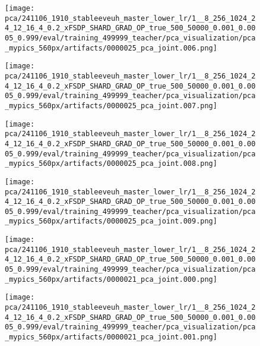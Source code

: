 \begin{figure*}[p]
\begin{subfigure}[t]{0.097\textwidth}
    \end{subfigure}\hfill
    \begin{subfigure}[t]{0.097\textwidth}
        \centering
        \texttt{[image: pca/241106\_1910\_stableeveuh\_master\_lower\_lr/1\_\_8\_256\_1024\_24\_12\_16\_4\_0.2\_xFSDP\_SHARD\_GRAD\_OP\_true\_500\_50000\_0.001\_0.0005\_0.999/eval/training\_499999\_teacher/pca\_visualization/pca\_mypics\_560px/artifacts/0000025\_pca\_joint.006.png]}
    \end{subfigure}\hfill
    \begin{subfigure}[t]{0.097\textwidth}
        \centering
        \texttt{[image: pca/241106\_1910\_stableeveuh\_master\_lower\_lr/1\_\_8\_256\_1024\_24\_12\_16\_4\_0.2\_xFSDP\_SHARD\_GRAD\_OP\_true\_500\_50000\_0.001\_0.0005\_0.999/eval/training\_499999\_teacher/pca\_visualization/pca\_mypics\_560px/artifacts/0000025\_pca\_joint.007.png]}
    \end{subfigure}\hfill
    \begin{subfigure}[t]{0.097\textwidth}
        \centering
        \texttt{[image: pca/241106\_1910\_stableeveuh\_master\_lower\_lr/1\_\_8\_256\_1024\_24\_12\_16\_4\_0.2\_xFSDP\_SHARD\_GRAD\_OP\_true\_500\_50000\_0.001\_0.0005\_0.999/eval/training\_499999\_teacher/pca\_visualization/pca\_mypics\_560px/artifacts/0000025\_pca\_joint.008.png]}
    \end{subfigure}\hfill
    \begin{subfigure}[t]{0.097\textwidth}
        \centering
        \texttt{[image: pca/241106\_1910\_stableeveuh\_master\_lower\_lr/1\_\_8\_256\_1024\_24\_12\_16\_4\_0.2\_xFSDP\_SHARD\_GRAD\_OP\_true\_500\_50000\_0.001\_0.0005\_0.999/eval/training\_499999\_teacher/pca\_visualization/pca\_mypics\_560px/artifacts/0000025\_pca\_joint.009.png]}
    \end{subfigure}
    \begin{subfigure}[t]{0.097\textwidth}
        \centering
        \texttt{[image: pca/241106\_1910\_stableeveuh\_master\_lower\_lr/1\_\_8\_256\_1024\_24\_12\_16\_4\_0.2\_xFSDP\_SHARD\_GRAD\_OP\_true\_500\_50000\_0.001\_0.0005\_0.999/eval/training\_499999\_teacher/pca\_visualization/pca\_mypics\_560px/artifacts/0000021\_pca\_joint.000.png]}
    \end{subfigure}\hfill
    \begin{subfigure}[t]{0.097\textwidth}
        \centering
        \texttt{[image: pca/241106\_1910\_stableeveuh\_master\_lower\_lr/1\_\_8\_256\_1024\_24\_12\_16\_4\_0.2\_xFSDP\_SHARD\_GRAD\_OP\_true\_500\_50000\_0.001\_0.0005\_0.999/eval/training\_499999\_teacher/pca\_visualization/pca\_mypics\_560px/artifacts/0000021\_pca\_joint.001.png]}

\end{subfigure}
\end{figure*}
